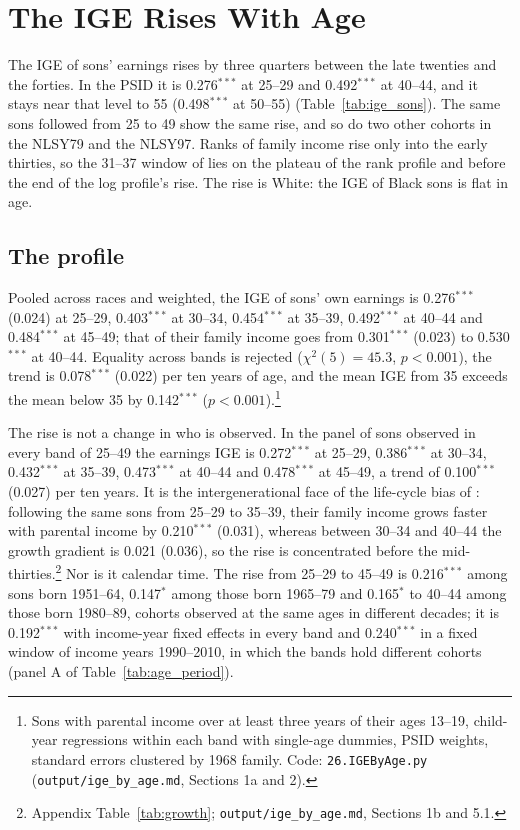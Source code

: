 \section{The IGE Rises With Age}\label{sec:ageprofile}

The IGE of sons' earnings rises by three quarters between the late twenties and the forties. In the PSID it is
0.276$^{***}$ at 25--29 and 0.492$^{***}$ at 40--44, and it stays near that level to 55 (0.498$^{***}$ at 50--55) (Table~\ref{tab:ige_sons}). The
same sons followed from 25 to 49 show the same rise, and so do two other cohorts in the NLSY79 and the NLSY97. Ranks of
family income rise only into the early thirties, so the 31--37 window of \citet{chetty2020race} lies on the plateau of the
rank profile and before the end of the log profile's rise. The rise is White: the IGE of Black sons is flat in age.

\subsection{The profile}

Pooled across races and weighted, the IGE of sons' own earnings is 0.276$^{***}$ (0.024) at 25--29, 0.403$^{***}$ at
30--34, 0.454$^{***}$ at 35--39, 0.492$^{***}$ at 40--44 and 0.484$^{***}$ at 45--49; that of their family income goes
from 0.301$^{***}$ (0.023) to 0.530$^{***}$ at 40--44. Equality across bands is rejected ($\chi^2(5) = 45.3$,
$p<0.001$), the trend is 0.078$^{***}$ (0.022) per ten years of age, and the mean IGE from 35 exceeds the mean below 35
by 0.142$^{***}$ ($p<0.001$).\footnote{Sons with parental income over at least three years of their ages 13--19, child-year
regressions within each band with single-age dummies, PSID weights, standard errors clustered by 1968 family. Code:
\texttt{26.IGEByAge.py} (\texttt{output/ige\_by\_age.md}, Sections 1a and 2).}



The rise is not a change in who is observed. In the panel of sons observed in every band of 25--49 the earnings IGE is
0.272$^{***}$ at 25--29, 0.386$^{***}$ at 30--34, 0.432$^{***}$ at 35--39, 0.473$^{***}$ at 40--44 and 0.478$^{***}$ at
45--49, a trend of 0.100$^{***}$ (0.027) per ten years. It is the intergenerational face of the life-cycle bias of
\citet{haider2006life}: following the same sons from 25--29 to 35--39, their family income grows faster with parental
income by 0.210$^{***}$ (0.031), whereas between 30--34 and 40--44 the growth gradient is 0.021 (0.036), so the rise is
concentrated before the mid-thirties.\footnote{Appendix Table~\ref{tab:growth}; \texttt{output/ige\_by\_age.md},
Sections 1b and 5.1.} Nor is it calendar time. The rise from 25--29 to 45--49 is 0.216$^{***}$ among sons born 1951--64,
0.147$^{*}$ among those born 1965--79 and 0.165$^{*}$ to 40--44 among those born 1980--89, cohorts observed at the same ages
in different decades; it is 0.192$^{***}$ with income-year fixed effects in every band and 0.240$^{***}$ in a fixed
window of income years 1990--2010, in which the bands hold different cohorts (panel A of Table~\ref{tab:age_period}).

